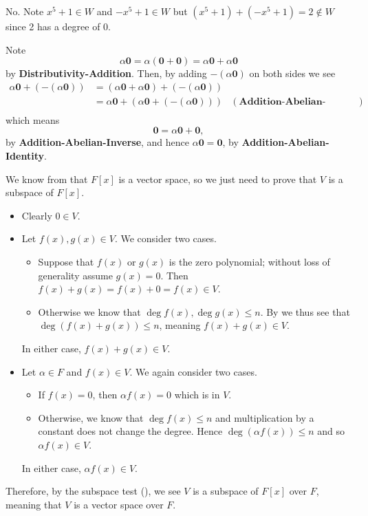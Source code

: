 \begin{questions}
    \item No. Note $x^5 + 1 \in W$ and $-x^5 + 1 \in W$ but $(x^5+1) + (-x^5+1) = 2 \notin W$ since 2 has a degree of 0.

    \item Note
    \[
        \alpha\textbf{0} = \alpha(\textbf{0} + \textbf{0}) = \alpha\textbf{0} + \alpha\textbf{0}
    \]
    by \textbf{Distributivity-Addition}. Then, by adding $-(\alpha\textbf{0})$ on both sides we see
    \begin{align*}
        \alpha\textbf{0} + (-(\alpha\textbf{0})) &= (\alpha\textbf{0} + \alpha\textbf{0}) + (-(\alpha\textbf{0}))\\
        &= \alpha\textbf{0} + (\alpha\textbf{0} + (-(\alpha\textbf{0}))) & (\textbf{Addition-Abelian-Associativity})\\
    \end{align*}
    which means
    \[
        \textbf{0} = \alpha\textbf{0} + \textbf{0},
    \]
    by \textbf{Addition-Abelian-Inverse}, and hence $\alpha\textbf{0} = \textbf{0}$, by \textbf{Addition-Abelian-Identity}.

    \item We know from  that $F[x]$ is a vector space, so we just need to prove that $V$ is a subspace of $F[x]$.
    \begin{itemize}
        \item Clearly $0 \in V$.
        \item Let $f(x), g(x) \in V$. We consider two cases.
        \begin{itemize}
            \item Suppose that $f(x)$ or $g(x)$ is the zero polynomial; without loss of generality assume $g(x) = 0$. Then $f(x) + g(x) = f(x) + 0 = f(x) \in V$.
            \item Otherwise we know that $\deg f(x), \deg g(x) \leq n$. By  we thus see that $\deg (f(x) + g(x)) \leq n$, meaning $f(x) + g(x) \in V$.
        \end{itemize}
        In either case, $f(x) + g(x) \in V$.
        \item Let $\alpha \in F$ and $f(x) \in V$. We again consider two cases.
        \begin{itemize}
            \item If $f(x) = 0$, then $\alpha f(x) = 0$ which is in $V$.
            \item Otherwise, we know that $\deg f(x) \leq n$ and multiplication by a constant does not change the degree. Hence $\deg (\alpha f(x)) \leq n$ and so $\alpha f(x) \in V$.
        \end{itemize}
        In either case, $\alpha f(x) \in V$.
    \end{itemize}
    Therefore, by the subspace test (), we see $V$ is a subspace of $F[x]$ over $F$, meaning that $V$ is a vector space over $F$.


\end{questions}
